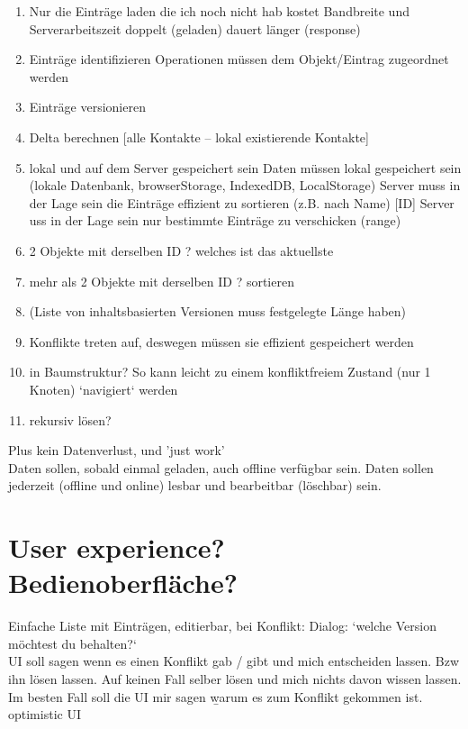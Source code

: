 \begin{enumerate}
  \item Nur die Einträge laden die ich noch nicht hab
    \subitem kostet Bandbreite und Serverarbeitszeit
    \subitem doppelt (geladen)
    \subitem dauert länger (response)
  \item Einträge identifizieren
    \subitem Operationen müssen dem Objekt/Eintrag zugeordnet werden
  \item Einträge versionieren
  \item Delta berechnen [alle Kontakte -- lokal existierende Kontakte]
  \item lokal und auf dem Server gespeichert sein
    \subitem Daten müssen lokal gespeichert sein (lokale Datenbank, browserStorage, IndexedDB, LocalStorage)
    \subitem Server muss in der Lage sein die Einträge effizient zu sortieren (z.B. nach Name) [ID]
    \subitem Server uss in der Lage sein nur bestimmte Einträge zu verschicken (range)
  \item 2 Objekte mit derselben ID ? welches ist das aktuellste
  \item mehr als 2 Objekte mit derselben ID ? sortieren
  \item (Liste von inhaltsbasierten Versionen muss festgelegte Länge haben)
  \item Konflikte treten auf, deswegen müssen sie effizient gespeichert werden
  \item in Baumstruktur? So kann leicht zu einem konfliktfreiem Zustand (nur 1 Knoten) `navigiert` werden
  \item rekursiv lösen?
\end{enumerate}
 Plus kein Datenverlust, und 'just work'\\
Daten sollen, sobald einmal geladen, auch offline verfügbar sein.
Daten sollen jederzeit (offline und online) lesbar und bearbeitbar (löschbar) sein.
%
%
\section{User experience? Bedienoberfläche?}
Einfache Liste mit Einträgen, editierbar, bei Konflikt: Dialog: `welche Version möchtest du behalten?`\\
\gls{UI} soll sagen wenn es einen Konflikt gab / gibt und mich entscheiden lassen. Bzw ihn lösen lassen.
Auf keinen Fall selber lösen und mich nichts davon wissen lassen.
Im besten Fall soll die \gls{UI} mir sagen \b{warum} es zum Konflikt gekommen ist.\\
\Gls{optimistic UI}\\
